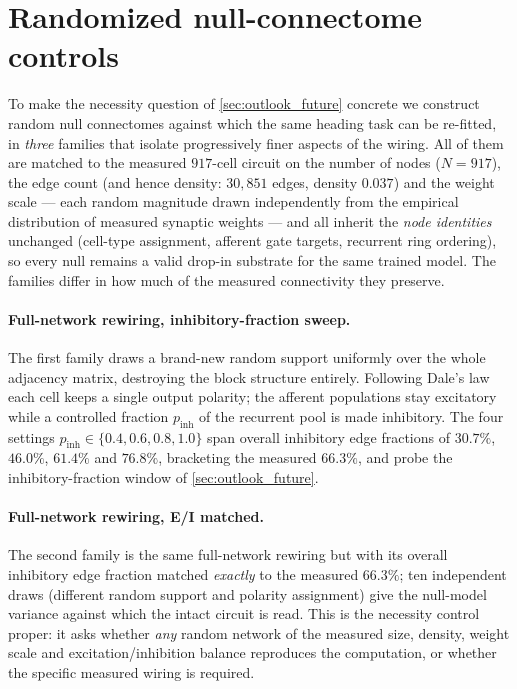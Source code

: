 \documentclass[11pt]{article}
\begin{document}
\section{Randomized null-connectome controls}
\label{app:er_null}

To make the necessity question of \cref{sec:outlook_future} concrete we
construct random null connectomes against which the same heading task can be
re-fitted, in \emph{three} families that isolate progressively finer aspects of
the wiring. All of them are matched to the measured $917$-cell circuit on the
number of nodes ($N=917$), the edge count (and hence density: $30{,}851$ edges,
density $0.037$) and the weight scale --- each random magnitude drawn
independently from the empirical distribution of measured synaptic weights ---
and all inherit the \emph{node identities} unchanged (cell-type assignment,
afferent gate targets, recurrent ring ordering), so every null remains a valid
drop-in substrate for the same trained model. The families differ in how much of
the measured connectivity they preserve.

\paragraph{Full-network rewiring, inhibitory-fraction sweep.} The first family
draws a brand-new random support uniformly over the whole adjacency matrix,
destroying the block structure entirely. Following Dale's law each cell keeps a
single output polarity; the afferent populations stay excitatory while a
controlled fraction $p_{\mathrm{inh}}$ of the recurrent pool is made inhibitory.
The four settings $p_{\mathrm{inh}}\in\{0.4,0.6,0.8,1.0\}$ span overall
inhibitory edge fractions of $30.7\%$, $46.0\%$, $61.4\%$ and $76.8\%$,
bracketing the measured $66.3\%$, and probe the inhibitory-fraction window of
\cref{sec:outlook_future}.

\paragraph{Full-network rewiring, E/I matched.} The second family is the same
full-network rewiring but with its overall inhibitory edge fraction matched
\emph{exactly} to the measured $66.3\%$; ten independent draws (different random
support and polarity assignment) give the null-model variance against which the
intact circuit is read. This is the necessity control proper: it asks whether
\emph{any} random network of the measured size, density, weight scale and
excitation/inhibition balance reproduces the computation, or whether the
specific measured wiring is required.
\end{document}

